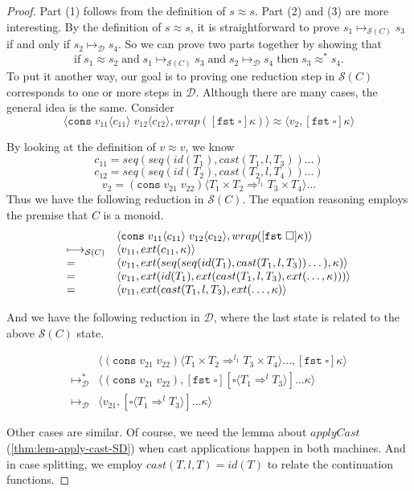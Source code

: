 \documentclass[acmsmall,review,anonymous]{acmart}\settopmatter{printfolios=true,printccs=false,printacmref=false}
\newcommand{\sOOreturn}[2]{\langle#1,#2\rangle}
\newcommand{\POOprod}[2]{#1 \times #2}
\newcommand{\cOOcast}[3]{#1 \Rightarrow^{#2} #3}
\newcommand{\vOOcast}[2]{#1\langle#2\rangle}
\newcommand{\vOOcons}[2]{\mathtt{cons}\;#1\;#2}
\newcommand{\kOOcar}[1]{[\mathtt{fst} \; \square]#1}
\newcommand{\kOOcast}[2]{
  [\square \langle #1 \rangle]#2}
\newcommand{\hcvOOcons}[4]{\mathtt{cons}\;#1\langle#2\rangle\;#3\langle#4\rangle}
\newcommand{\judgeSreduce}[3]{#2 \longmapsto_{\mathcal{S}(#1)} #3}
\newcommand{\ineffCEKD}{\ensuremath{\mathcal{D}}}
\newcommand{\judgeDreduce}[2]{#1 \longmapsto_{\mathcal{D}} #2}
\newcommand{\effCEK}[1]{\ensuremath{\mathcal{S}(#1)}}
\begin{document}
\begin{proof}
  Part (1) follows from the definition of $s \approx s$.
  Part (2) and (3) are more interesting. 
  By the definition of $s \approx s$, it is straightforward to prove 
  $\judgeSreduce{C}{s_1}{s_3}$ if and only if $\judgeDreduce{s_2}{s_4}$.
  So we can prove two parts together by showing that 
  \[
  \text{if}\; s_{1} \approx s_{2}
  \;\text{and}\;\judgeSreduce{C}{s_1}{s_3}
  \;\text{and}\;\judgeDreduce{s_2}{s_4}
  \;\text{then}\; s_3 \approx^{*} s_4.
  \]
  To put it another way, our goal is to proving 
  one reduction step in \effCEK{C} corresponds to
  one or more steps in \ineffCEKD.  
  Although there are many cases, the general idea is the same.
  Consider
  \[
  \sOOreturn{\hcvOOcons{v_{11}}{c_{11}}{v_{12}}{c_{12}}}{
    wrap(\kOOcar{\kappa})
  }
  \approx
  \sOOreturn{v_2}{\kOOcar{\kappa}}
  \]

  By looking at the definition of $v \approx v$, we know
  \[ c_{11} = seq(seq(id(T_1),cast(T_1,l,T_3)) \dots) \]
  \[ c_{12} = seq(seq(id(T_2),cast(T_2,l,T_4)) \dots) \] 
  \[ v_2 = \vOOcast{(\vOOcons{v_{21}}{v_{22}})}{
    \cOOcast{\POOprod{T_1}{T_2}}{l_1}{\POOprod{T_3}{T_4}}} \dots
  \]
  Thus we have the following reduction in \effCEK{C}. The equation 
  reasoning employs the premise that $C$ is a monoid.
  \[
  \begin{array}{ll}
&
\sOOreturn{\hcvOOcons{v_{11}}{c_{11}}{v_{12}}{c_{12}}}{wrap(\kOOcar{\kappa})}
\\
\longmapsto_\text{\effCEK{C}} &
\sOOreturn{v_{11}}{ext(c_{11},\kappa)}
\\
= &
\sOOreturn{v_{11}}{ext(seq(seq(id(T_1),cast(T_1,l,T_3))\dots),\kappa)}
\\
= &
\sOOreturn{v_{11}}{
	ext(id(T_1),ext(cast(T_1,l,T_3),ext(\dots,\kappa)))
}
\\
= &
\sOOreturn{v_{11}}{ext(cast(T_1,l,T_3),ext(\dots,\kappa)}
  \end{array}
  \]

And we have the following reduction in \ineffCEKD, where the last state is 
related to the above \effCEK{C} state.

\[
\begin{array}{ll}
& \sOOreturn{
  \vOOcast{(\vOOcons{v_{21}}{v_{22}})}{   
  \cOOcast{\POOprod{T_1}{T_2}}{l_1}{\POOprod{T_3}{T_4}}} \dots
}{\kOOcar{\kappa}}
\\
\longmapsto_{\mathcal{D}}^{*} &
\sOOreturn{(\vOOcons{v_{21}}{v_{22}})}{
  \kOOcar{
  \kOOcast{\cOOcast{T_1}{l}{T_3}}{\dots\kappa}
}}
\\
\longmapsto_{\mathcal{D}} &
\sOOreturn{v_{21}}{
  \kOOcast{\cOOcast{T_1}{l}{T_3}}{\dots\kappa}
}
\end{array}
\]

Other cases are similar. Of course, we need the lemma about $applyCast$ 
(\ref{thm:lem-apply-cast-SD}) when cast applications happen in both machines. 
And in case splitting, we employ $cast(T,l,T)=id(T)$ to relate the continuation 
functions.
\end{proof}
\end{document}
